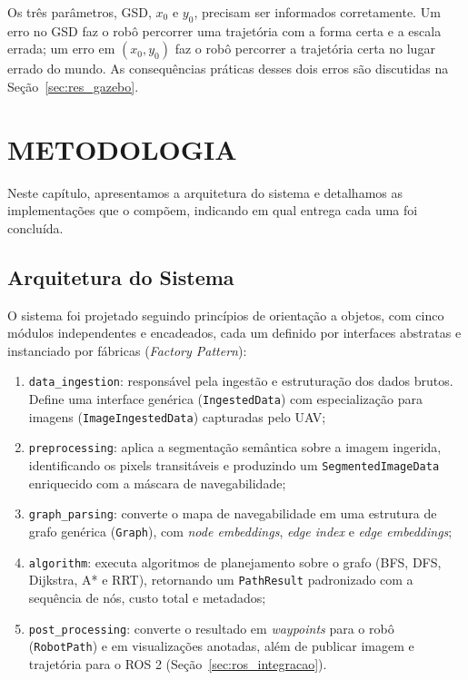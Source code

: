\documentclass[
    12pt,
    openright,
    oneside,
    a4paper,
    english,
    brazil
]{abntex2}
\begin{document}
Os três parâmetros, GSD, $x_0$ e $y_0$, precisam ser informados corretamente. Um erro no GSD faz o robô percorrer uma trajetória com a forma certa e a escala errada; um erro em $(x_0, y_0)$ faz o robô percorrer a trajetória certa no lugar errado do mundo. As consequências práticas desses dois erros são discutidas na Seção~\ref{sec:res_gazebo}.

\chapter{METODOLOGIA}
\label{cap:metodologia}

Neste capítulo, apresentamos a arquitetura do sistema e detalhamos as implementações que o compõem, indicando em qual entrega cada uma foi concluída.

\section{Arquitetura do Sistema}

O sistema foi projetado seguindo princípios de orientação a objetos, com cinco módulos independentes e encadeados, cada um definido por interfaces abstratas e instanciado por fábricas (\textit{Factory Pattern}):

\begin{enumerate}
    \item \texttt{data\_ingestion}: responsável pela ingestão e estruturação dos dados brutos. Define uma interface genérica (\texttt{IngestedData}) com especialização para imagens (\texttt{Image\allowbreak Ingested\allowbreak Data}) capturadas pelo UAV;
    \item \texttt{preprocessing}: aplica a segmentação semântica sobre a imagem ingerida, identificando os pixels transitáveis e produzindo um \texttt{SegmentedImageData} enriquecido com a máscara de navegabilidade;
    \item \texttt{graph\_parsing}: converte o mapa de navegabilidade em uma estrutura de grafo genérica (\texttt{Graph}), com \textit{node embeddings}, \textit{edge index} e \textit{edge embeddings};
    \item \texttt{algorithm}: executa algoritmos de planejamento sobre o grafo (BFS, DFS, Dijkstra, A* e RRT), retornando um \texttt{PathResult} padronizado com a sequência de nós, custo total e metadados;
    \item \texttt{post\_processing}: converte o resultado em \textit{waypoints} para o robô (\texttt{RobotPath}) e em visualizações anotadas, além de publicar imagem e trajetória para o ROS 2 (Seção~\ref{sec:ros_integracao}).
\end{enumerate}
\end{document}

